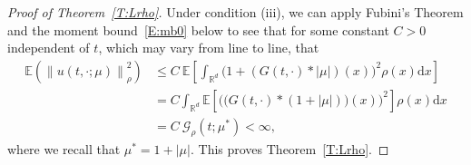 \documentclass[sn-mathphys]{sn-jnl}%
\newcommand{\BR}{\mathbb{R}}
\newcommand{\E}{\mathbb{E}}
\newcommand{\Norm}[1]{\left\| #1 \right\|}
\newcommand{\ud}{\ensuremath{\mathrm{d}}}
\numberwithin{equation}{section}
\theoremstyle{thmstyleone}%
\theoremstyle{thmstyletwo}%
\theoremstyle{thmstylethree}%
\begin{document}
\begin{proof}[Proof of Theorem~\ref{T:Lrho}]
  Under condition (iii), we can apply Fubini's Theorem and the moment bound~\eqref{E:mb0} below to
  see that for some constant $C>0$ independent of $t$, which may vary from line to line, that
  \begin{align*}
    \E\left(\Norm{u(t,\cdot;\mu)}_{\rho}^2\right)
    & \le C\: \E \left[\int_{\BR^d}\bigg(1+(G(t,\cdot) * \lvert\mu\rvert)(x)\bigg)^2\rho(x)\ud x\right] \\
    & = C \int_{\BR^d}\E \left[\bigg(\Big(G(t,\cdot) *(1+\lvert\mu\rvert)\Big)(x) \bigg)^2\right]\rho(x)\ud x \\
    & = C \:\mathcal{G}_{\rho}(t;\mu^*) < \infty,
  \end{align*}
  where we recall that $\mu^* = 1+\lvert\mu\rvert$. This proves Theorem~\ref{T:Lrho}.
\end{proof}
\end{document}
